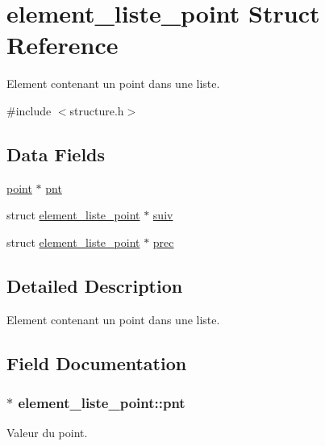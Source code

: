 \hypertarget{structelement__liste__point}{}\section{element\+\_\+liste\+\_\+point Struct Reference}
\label{structelement__liste__point}


Element contenant un point dans une liste.  




{\ttfamily \#include $<$structure.\+h$>$}

\subsection*{Data Fields}
\begin{DoxyCompactItemize}
\item 
\hyperlink{structpoint}{point} $\ast$ \hyperlink{structelement__liste__point_a05cfbb663d78b6a9b56ab28c62abbd53}{pnt}
\item 
struct \hyperlink{structelement__liste__point}{element\+\_\+liste\+\_\+point} $\ast$ \hyperlink{structelement__liste__point_ae93ea1296e301ab4aa7a362b677a3c49}{suiv}
\item 
struct \hyperlink{structelement__liste__point}{element\+\_\+liste\+\_\+point} $\ast$ \hyperlink{structelement__liste__point_ab018ca42acbb6b97e2eeea9b98a2e4d0}{prec}
\end{DoxyCompactItemize}


\subsection{Detailed Description}
Element contenant un point dans une liste. 

\subsection{Field Documentation}
\subsubsection[{\texorpdfstring{pnt}{pnt}}]{$\ast$ element\+\_\+liste\+\_\+point\+::pnt}\hypertarget{structelement__liste__point_a05cfbb663d78b6a9b56ab28c62abbd53}{}\label{structelement__liste__point_a05cfbb663d78b6a9b56ab28c62abbd53}
Valeur du point. 
